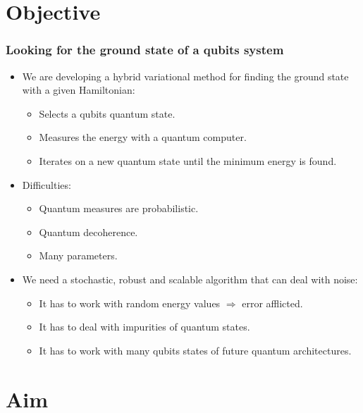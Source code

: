 \documentclass[10pt,t,xcolor=dvipsnames,aspectratio=169]{beamer}
\begin{document}
\section{Objective}

\begin{frame}
    \frametitle{Looking for the ground state of a qubits system}
    \begin{itemize}
        \item
            We are developing a hybrid variational method for finding the ground state with a given Hamiltonian:
            \begin{itemize}
                \item Selects a qubits quantum state.
                \item Measures the energy with a quantum computer.
                \item Iterates on a new quantum state until the minimum energy is found.
            \end{itemize}
        \item
            Difficulties:
            \begin{itemize}
                \item Quantum measures are probabilistic.
                \item Quantum decoherence.
                \item Many parameters.
            \end{itemize}
        \item
            We need a stochastic, robust and scalable algorithm that can deal with noise:
            \begin{itemize}
                \item It has to work with random energy values $\Rightarrow$ error afflicted.
                \item It has to deal with impurities of quantum states.
                \item It has to work with many qubits states of future quantum architectures.
            \end{itemize}
    \end{itemize}
\end{frame}

\section{Aim}
\end{document}

